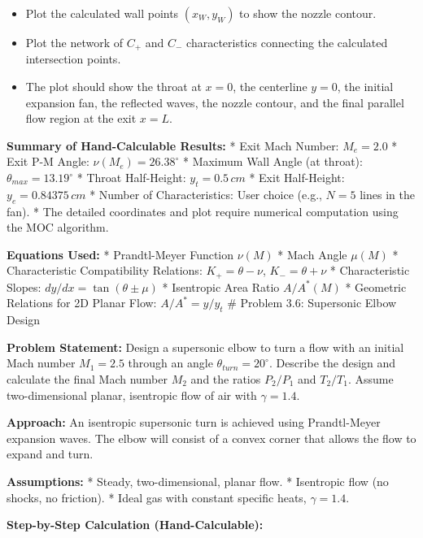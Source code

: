 \begin{enumerate}
  \begin{itemize}
  \tightlist
  \item
    Plot the calculated wall points \((x_W, y_W)\) to show the nozzle
    contour.
  \item
    Plot the network of \(C_+\) and \(C_-\) characteristics connecting
    the calculated intersection points.
  \item
    The plot should show the throat at \(x=0\), the centerline \(y=0\),
    the initial expansion fan, the reflected waves, the nozzle contour,
    and the final parallel flow region at the exit \(x=L\).
  \end{itemize}
\end{enumerate}

\textbf{Summary of Hand-Calculable Results:} * Exit Mach Number:
\(M_e = 2.0\) * Exit P-M Angle: \(\nu(M_e) = 26.38^\circ\) * Maximum
Wall Angle (at throat): \(\theta_{max} = 13.19^\circ\) * Throat
Half-Height: \(y_t = 0.5 \, cm\) * Exit Half-Height:
\(y_e = 0.84375 \, cm\) * Number of Characteristics: User choice (e.g.,
\(N=5\) lines in the fan). * The detailed coordinates and plot require
numerical computation using the MOC algorithm.

\textbf{Equations Used:} * Prandtl-Meyer Function \(\nu(M)\) * Mach
Angle \(\mu(M)\) * Characteristic Compatibility Relations:
\(K_+ = \theta - \nu\), \(K_- = \theta + \nu\) * Characteristic Slopes:
\(dy/dx = \tan(\theta \pm \mu)\) * Isentropic Area Ratio \(A/A^*(M)\) *
Geometric Relations for 2D Planar Flow: \(A/A^* = y/y_t\) \# Problem
3.6: Supersonic Elbow Design

\textbf{Problem Statement:} Design a supersonic elbow to turn a flow
with an initial Mach number \(M_1 = 2.5\) through an angle
\(\theta_{turn} = 20^\circ\). Describe the design and calculate the
final Mach number \(M_2\) and the ratios \(P_2/P_1\) and \(T_2/T_1\).
Assume two-dimensional planar, isentropic flow of air with
\(\gamma = 1.4\).

\textbf{Approach:} An isentropic supersonic turn is achieved using
Prandtl-Meyer expansion waves. The elbow will consist of a convex corner
that allows the flow to expand and turn.

\textbf{Assumptions:} * Steady, two-dimensional, planar flow. *
Isentropic flow (no shocks, no friction). * Ideal gas with constant
specific heats, \(\gamma = 1.4\).

\textbf{Step-by-Step Calculation (Hand-Calculable):}

